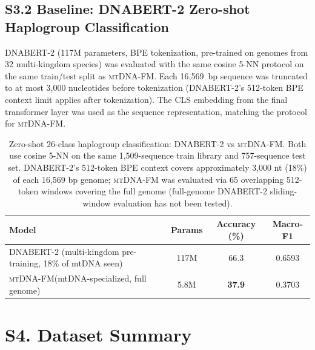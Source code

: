 \documentclass[10pt]{article}
\newcommand{\mtdnafm}{\textsc{mtDNA-FM}\xspace}
\begin{document}
\subsection*{S3.2 Baseline: DNABERT-2 Zero-shot Haplogroup Classification}

DNABERT-2 \citep{zhou2024dnabert2} (117M parameters, BPE tokenization, pre-trained on genomes
from 32 multi-kingdom species) was evaluated with the same cosine 5-NN protocol on the same
train/test split as \mtdnafm. Each 16,569~bp sequence was truncated to at most 3,000 nucleotides
before tokenization (DNABERT-2's 512-token BPE context limit applies after tokenization). The CLS
embedding from the final transformer layer was used as the sequence representation, matching the
protocol for \mtdnafm.

\begin{table}[h]
\centering
\caption{Zero-shot 26-class haplogroup classification: DNABERT-2 vs \mtdnafm.
Both use cosine 5-NN on the same 1,509-sequence train library and 757-sequence test
set. DNABERT-2's 512-token BPE context covers approximately 3,000 nt (18\%) of each
16,569 bp genome; \mtdnafm{} was evaluated via 65 overlapping 512-token windows covering the
full genome (full-genome DNABERT-2 sliding-window evaluation has not been tested).}
\begin{tabular}{lccc}
\toprule
\textbf{Model} & \textbf{Params} & \textbf{Accuracy (\%)} & \textbf{Macro-F1} \\
\midrule
DNABERT-2 (multi-kingdom pre-training, 18\% of mtDNA seen) & 117M & 66.3 & 0.6593 \\
\mtdnafm (mtDNA-specialized, full genome) & 5.8M & \textbf{37.9} & 0.3703 \\
\bottomrule
\end{tabular}
\label{tab:dnabert2_baseline}
\end{table}

\section*{S4. Dataset Summary}
\end{document}
